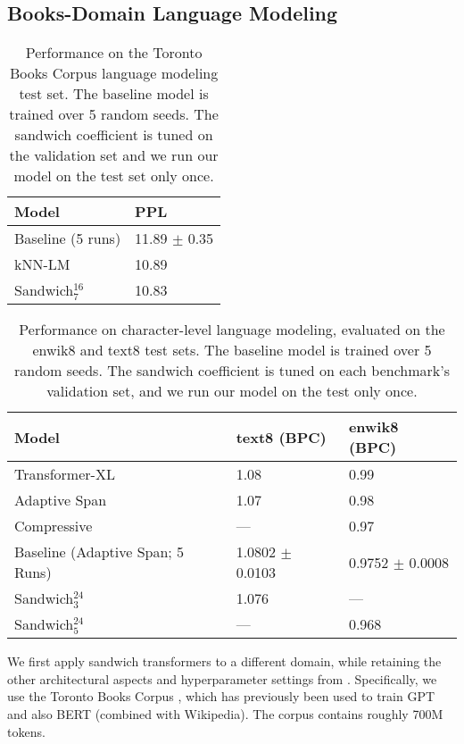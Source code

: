 \documentclass[11pt,a4paper]{article}
\begin{document}
\subsection{Books-Domain Language Modeling}
\label{sec.books}

\begin{table}[t]
\centering
\small
\begin{tabular}{@{}ll@{}}
\toprule
\textbf{Model} & \textbf{PPL}  \\
\midrule
Baseline (5 runs) & 11.89 $\pm$ 0.35 \\
kNN-LM \cite{urvashi} & 10.89 \\ 
Sandwich$^{16}_7$ & 10.83 \\
\bottomrule
\end{tabular}
\caption{Performance on the Toronto Books Corpus language modeling test set. The baseline model \cite{baevski2018adaptive} is trained over 5 random seeds. The sandwich coefficient is tuned on the validation set and we run our model on the test set only once.}
\label{tab.bookstest}
\end{table}


\begin{table*}[t]
\centering
\small
\begin{tabular}{@{}lll@{}}
\toprule
\textbf{Model} & \textbf{text8 (BPC)} & \textbf{enwik8 (BPC)}  \\
\midrule
Transformer-XL \cite{transformerXL} & 1.08 & 0.99 \\ 
Adaptive Span \cite{Sukhbaatar2019} & 1.07 & 0.98 \\
Compressive \cite{compressive} & --- & 0.97 \\
\midrule
Baseline (Adaptive Span; 5 Runs) & 1.0802 $\pm$ 0.0103 & 0.9752 $\pm$ 0.0008 \\
Sandwich$^{24}_3$ & 1.076 & --- \\
Sandwich$^{24}_5$ & --- & 0.968 \\
\bottomrule
\end{tabular}
\caption{Performance on character-level language modeling, evaluated on the enwik8 and text8 test sets. The baseline model \cite{Sukhbaatar2019} is trained over 5 random seeds. The sandwich coefficient is tuned on each benchmark's validation set, and we run our model on the test only once.}
\label{tab.charlm}
\end{table*}

We first apply sandwich transformers to a different domain, while retaining the other architectural aspects and hyperparameter settings from \citet{baevski2018adaptive}.
Specifically, we use the Toronto Books Corpus  \cite{moviebook}, which has previously been used to train GPT \cite{gpt-1} and  also  BERT \cite{BERT} (combined with Wikipedia). The corpus contains roughly 700M tokens.
\end{document}
